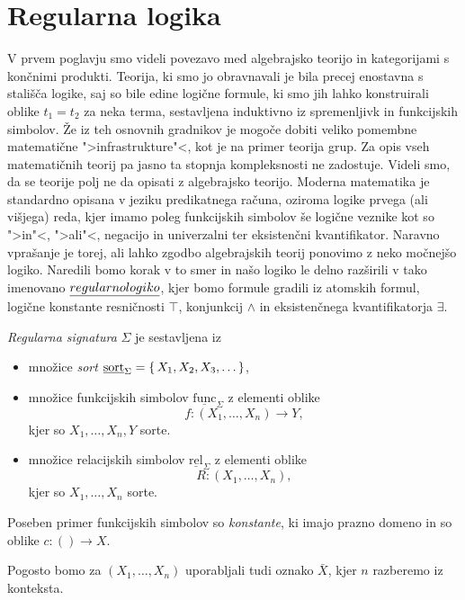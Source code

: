 \documentclass[../kategoricna_logika.tex]{subfiles}
\begin{document}
\section{Regularna logika}
V prvem poglavju smo videli povezavo med algebrajsko teorijo in
kategorijami s končnimi produkti.  Teorija, ki smo jo obravnavali je
bila precej enostavna s stališča logike, saj so bile edine logične
formule, ki smo jih lahko konstruirali oblike $t_1 = t_2$ za neka
terma, sestavljena induktivno iz spremenljivk in funkcijskih simbolov.
Že iz teh osnovnih gradnikov je mogoče dobiti veliko pomembne
matematične ">infrastrukture"<, kot je na primer teorija grup.  Za
opis vseh matematičnih teorij pa jasno ta stopnja kompleksnosti ne
zadostuje.  Videli smo, da se teorije polj ne da opisati z algebrajsko
teorijo.  Moderna matematika je standardno opisana v jeziku predikatnega
računa, oziroma logike prvega (ali višjega) reda, kjer imamo poleg
funkcijskih simbolov še logične veznike kot so ">in"<, ">ali"<,
negacijo in univerzalni ter eksistenčni kvantifikator.  Naravno
vprašanje je torej, ali lahko zgodbo algebrajskih teorij ponovimo z
neko močnejšo logiko. Naredili bomo korak v to
smer in našo logiko le delno razširili v tako imenovano
$\emph{regularno logiko}$, kjer bomo formule gradili iz atomskih
formul, logične konstante resničnosti $\top$, konjunkcij $\wedge$ in
eksistenčnega kvantifikatorja $\exists$.
\begin{definicija}
  \emph{Regularna signatura} $\Sigma$ je sestavljena iz
  \begin{itemize}
  \item množice \emph{sort}
    $\underline{\mathrm{sort}}_\Sigma = \lbrace\,X_1, X_2, X_3, \ldots\,\rbrace$,
  \item množice funkcijskih simbolov
    $\underline{\mathrm{func}}_\Sigma$ z elementi oblike
    \[ f : (X_1, \ldots, X_n) \to Y,\]
    kjer so $X_1,\ldots, X_n,Y$ sorte.
  \item množice relacijskih simbolov
    $\underline{\mathrm{rel}}_\Sigma$ z elementi oblike
    \[ R : (X_1,\ldots, X_n),\]
    kjer so $X_1,\ldots, X_n$ sorte.
  \end{itemize}
\end{definicija}
\begin{opomba}
  Poseben primer funkcijskih simbolov so \emph{konstante}, ki imajo
  prazno domeno in so oblike $c : () \to X$. 
\end{opomba}
Pogosto bomo za $(X_1, \ldots, X_n)$ uporabljali tudi oznako
$\bar{X}$, kjer $n$ razberemo iz konteksta.
\end{document}
